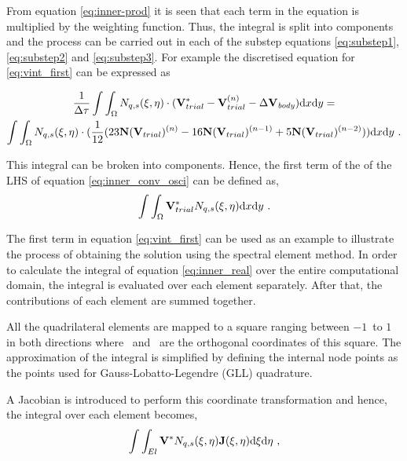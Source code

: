 From equation \ref{eq:inner-prod} it is seen that each term in the equation is multiplied by the weighting function. Thus, the integral is split into components and the process can be carried out in each of the substep equations \ref{eq:substep1}, \ref{eq:substep2} and \ref{eq:substep3}. For example the discretised equation for \ref{eq:vint_first} can be expressed as

\setlength{\multlinegap}{0.2\textwidth}
\begin{multline} 
\label{eq:inner_conv_osci}
\frac{1}{\Delta\tau}\int\int_{\Omega}N_{q,s}(\xi,\eta)\cdot(\mathbf{V}_{trial}^{*} - \mathbf{V}_{trial}^{(n)} - \Delta\mathbf{V}_{\mathit{body}})\mathrm{d}x\mathrm{d}y = \\
\int\int_{\Omega}N_{q,s}(\xi,\eta)\cdot(\frac{1}{12}(23\mathbf{N}(\mathbf{V}_{trial})^{(n)} - 16\mathbf{N}(\mathbf{V}_{trial})^{(n-1)} + 5\mathbf{N}(\mathbf{V}_{trial})^{(n-2)}))\mathrm{d}x\mathrm{d}y ~.
\end{multline}

 This integral can be broken into components. Hence, the first term of the of the LHS of equation \ref{eq:inner_conv_osci} can be defined as,  
\begin{equation} \centering
\label{eq:inner_real}
\int\int_{\Omega}\Vtrial^{*} N_{q,s}(\compone,\comptwo)\mathrm{d}x\mathrm{d}y ~.
\end{equation}


The first term in equation \ref{eq:vint_first} can be used as an example to illustrate the process of obtaining the solution using the spectral element method. In order to calculate the integral of equation \ref{eq:inner_real}  over the entire computational domain, the integral is evaluated over each element separately. After that, the contributions of each element are summed together. 

All the quadrilateral elements are mapped to a square ranging between $-1$\ to $1$ in both directions where \compone\ and \comptwo\ are the orthogonal coordinates of this square. The approximation of the integral is simplified by defining the internal node points as the points used for Gauss-Lobatto-Legendre (GLL) quadrature.

A Jacobian is introduced to perform this coordinate transformation and hence, the integral over each element becomes,
\begin{equation} \centering
\label{eq:inner_comp}
\int\int_{El}\Vint N_{q,s}(\compone,\comptwo)\jacobian(\compone, \comptwo)\mathrm{d}\compone \mathrm{d}\comptwo ~,
\end{equation}

